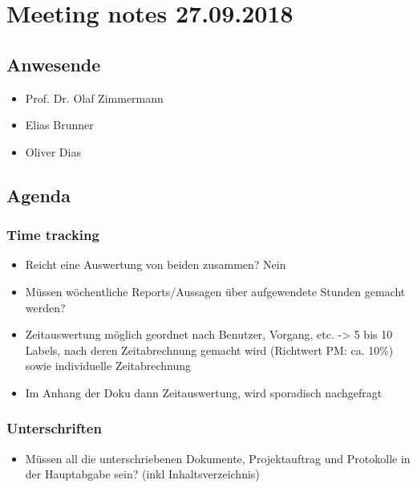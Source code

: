 \hypertarget{meeting-notes-27.09.2018}{%
\section*{Meeting notes 27.09.2018}\label{meeting-notes-27.09.2018}}

\hypertarget{anwesende}{%
\subsection*{Anwesende}\label{anwesende}}

\begin{itemize}

\item
  Prof. Dr. Olaf Zimmermann
\item
  Elias Brunner
\item
  Oliver Dias
\end{itemize}

\hypertarget{agenda}{%
\subsection*{Agenda}\label{agenda}}

\hypertarget{time-tracking}{%
\subsubsection*{Time tracking}\label{time-tracking}}

\begin{itemize}

\item
  Reicht eine Auswertung von beiden zusammen? Nein
\item
  Müssen wöchentliche Reports/Aussagen über aufgewendete Stunden gemacht
  werden?
\item
  Zeitauswertung möglich geordnet nach Benutzer, Vorgang, etc.
  -\textgreater{} 5 bis 10 Labels, nach deren Zeitabrechnung gemacht
  wird (Richtwert PM: ca. 10\%) sowie individuelle Zeitabrechnung
\item
  Im Anhang der Doku dann Zeitauswertung, wird sporadisch nachgefragt
\end{itemize}

\hypertarget{unterschriften}{%
\subsubsection*{Unterschriften}\label{unterschriften}}

\begin{itemize}

\item
  Müssen all die unterschriebenen Dokumente, Projektauftrag und
  Protokolle in der Hauptabgabe sein? (inkl Inhaltsverzeichnis)
\end{itemize}

